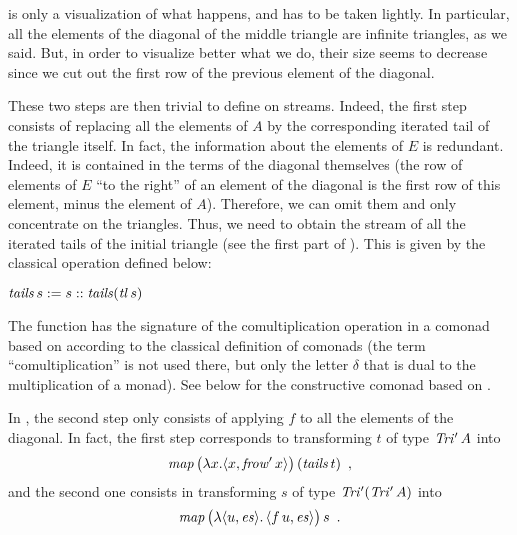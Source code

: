 \begin{remark}
   is only a visualization of what happens, and has
  to be taken lightly. In particular, all the elements of the diagonal
  of the middle triangle are infinite triangles, as we said. But, in
  order to visualize better what we do, their size seems to decrease
  since we cut out the first row of the previous element of the
  diagonal. 
\end{remark}
\noindent
These two steps are then trivial to define on streams. Indeed, the
first step consists of replacing all the elements of $A$ by the
corresponding iterated tail of the triangle itself. In fact, the
information about the elements of $E$ is redundant. Indeed, it is
contained in the terms of the diagonal themselves (the row of elements
of $E$ ``to the right'' of an element of the diagonal is the first row
of this element, minus the element of $A$). Therefore, we can omit
them and only concentrate on the triangles. Thus, we need to obtain
the stream of all the iterated tails of the initial triangle (see the
first part of ). This is given by the classical \tls{}
operation defined below:
\begin{definition}
  $\mathit{tails}\,s := s :: \mathit{tails} (\mathit{tl}\,s)$
\end{definition}
\begin{remark}
  The function \tls{} has the signature of the comultiplication
  operation in a comonad based on \Str{} according to the classical
  definition of comonads \cite{maclane} (the term
  ``comultiplication'' is not used there, but only the letter $\delta$
  that is dual to the multiplication of a monad). See
   below for the constructive comonad based on
  \Str{}.
\end{remark}
\noindent
In , the second step only consists of applying $f$ to
all the elements of the diagonal. In fact, the first step corresponds
to transforming $t$ of type $\mathit{Tri'}\,A$ into
$$\mathit{map}\,\bigl(\lambda x.\langle x,\mathit{frow'}\,x\rangle\bigr)\,(\mathit{tails}\,t)\enspace,$$
and the second one consists in transforming $s$ of type $\mathit{Tri'}(\mathit{Tri'}\,A)$ into
$$\mathit{map}\,\bigl(\lambda\langle u,\mathit{es}\rangle.\,\langle f\,u,\mathit{es}\rangle\bigr)\,s\enspace.$$

